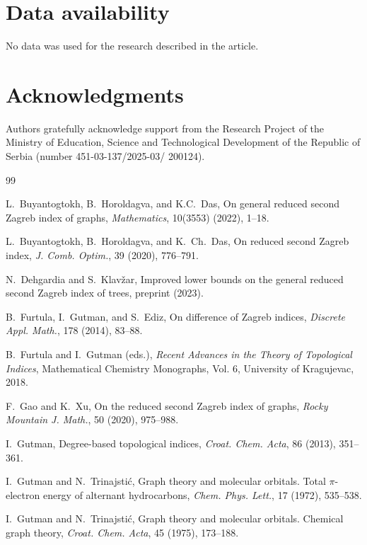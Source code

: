 \documentclass[preprint,12pt]{elsarticle}
\begin{document}
\section*{Data availability}

No data was used for the research described in the article.

\section*{Acknowledgments}

Authors gratefully acknowledge support from the Research Project
of the Ministry of Education, Science and Technological Development of the Republic of Serbia (number 451-03-137/2025-03/ 200124).


\begin{thebibliography}{99}







L.~Buyantogtokh, B.~Horoldagva, and K.C.~Das, On general reduced second Zagreb index of graphs, \emph{Mathematics}, 10(3553) (2022), 1–18.

L.~Buyantogtokh, B.~Horoldagva, and K.~Ch.~Das,
On reduced second Zagreb index,
\emph{J. Comb. Optim.}, 39 (2020), 776–791.

N.~Dehgardia and S.~Klavžar, Improved lower bounds on the general reduced second Zagreb index of trees, preprint (2023).

B.~Furtula, I.~Gutman, and S.~Ediz, On difference of Zagreb indices, \emph{Discrete Appl. Math.}, 178 (2014), 83–88.

B.~Furtula and I.~Gutman (eds.), \emph{Recent Advances in the Theory of Topological Indices}, Mathematical Chemistry Monographs, Vol. 6, University of Kragujevac, 2018.

F.~Gao and K.~Xu,
On the reduced second Zagreb index of graphs,
\emph{Rocky Mountain J. Math.}, 50 (2020), 975–988.


I.~Gutman, Degree-based topological indices, \emph{Croat. Chem. Acta}, 86 (2013), 351–361.

I.~Gutman and N.~Trinajstić, Graph theory and molecular orbitals. Total $\pi$-electron energy of alternant hydrocarbons, \emph{Chem. Phys. Lett.}, 17 (1972), 535–538.

I.~Gutman and N.~Trinajstić, Graph theory and molecular orbitals. Chemical graph theory, \emph{Croat. Chem. Acta}, 45 (1975), 173–188.


\end{thebibliography}
\end{document}

